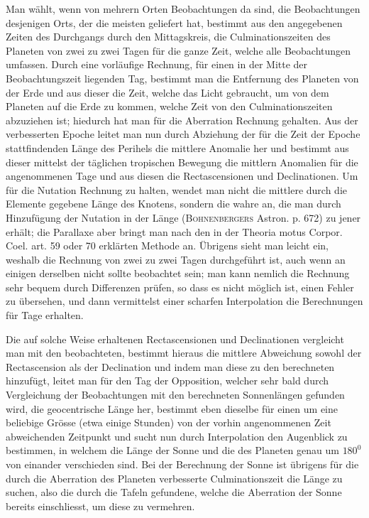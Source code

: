 Man wählt, wenn von mehrern Orten Beobachtungen da sind, die Beobachtungen
desjenigen Orts, der die meisten geliefert hat, bestimmt aus den angegebenen
Zeiten des Durchgangs durch den Mittagskreis, die Culminationszeiten des
Planeten von zwei zu zwei Tagen für die ganze Zeit, welche alle Beobachtungen
umfassen. Durch eine vorläufige Rechnung, für einen in der Mitte der
Beobachtungszeit liegenden Tag, bestimmt man die Entfernung des Planeten von
der Erde und aus dieser die Zeit, welche das Licht gebraucht, um von dem
Planeten auf die Erde zu kommen, welche Zeit von den Culminationszeiten
abzuziehen ist; hiedurch hat man für die Aberration Rechnung gehalten. Aus
der verbesserten Epoche leitet man nun durch Abziehung der für die Zeit der
Epoche stattfindenden Länge des Perihels die mittlere Anomalie her und
bestimmt aus dieser mittelst der täglichen tropischen Bewegung die mittlern
Anomalien für die angenommenen Tage und aus diesen die Rectascensionen und
Declinationen. Um für die Nutation Rechnung zu halten, wendet man nicht die
mittlere durch die Elemente gegebene Länge des Knotens, sondern die wahre an,
die man durch Hinzufügung der Nutation in der Länge (\textsc{Bohnenbergers}
Astron. p. 672) zu jener erhält; die Parallaxe aber bringt man nach den in der
Theoria motus Corpor. Coel. art. 59 oder 70 erklärten Methode an. Übrigens
sieht man leicht ein, weshalb die Rechnung von zwei zu zwei Tagen
durchgeführt ist, auch wenn an einigen derselben nicht sollte beobachtet sein;
man kann nemlich die Rechnung sehr bequem durch Differenzen prüfen, so dass
es nicht möglich ist, einen Fehler zu übersehen, und dann vermittelst einer
scharfen Interpolation die Berechnungen für  Tage erhalten.

Die auf solche Weise erhaltenen Rectascensionen und Declinationen vergleicht
man mit den beobachteten, bestimmt hieraus die mittlere Abweichung sowohl der
Rectascension als der Declination und indem man diese zu den berechneten
hinzufügt, leitet man für den Tag der Opposition, welcher sehr bald
durch Vergleichung der Beobachtungen mit den berechneten Sonnenlängen gefunden wird, die geocentrische Länge her, bestimmt eben dieselbe für einen um eine beliebige Grösse (etwa einige Stunden) von der vorhin angenommenen Zeit abweichenden Zeitpunkt und sucht nun durch Interpolation den Augenblick zu bestimmen, in welchem die Länge der Sonne und die des Planeten genau um \(180^{0}\) von einander verschieden sind. Bei der Berechnung der Sonne ist übrigens für die durch die Aberration des Planeten verbesserte Culminationszeit die  Länge zu suchen, also die durch die Tafeln gefundene, welche die Aberration der Sonne bereits einschliesst, um diese zu vermehren.

